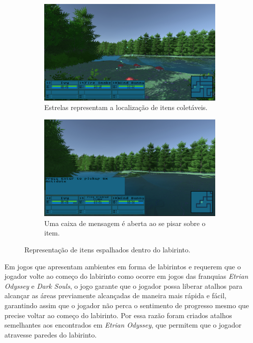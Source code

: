 \begin{figure}[h!]
  \centering
  \begin{subfigure}[b]{0.4\linewidth}
    \includegraphics[width=\linewidth]{itemspot.jpg}
    \caption{Estrelas representam a localização de itens coletáveis.}
  \end{subfigure}
  \begin{subfigure}[b]{0.4\linewidth}
    \includegraphics[width=\linewidth]{itemprompt.jpg}
    \caption{Uma caixa de mensagem é aberta ao se pisar sobre o item.}
  \end{subfigure}
  \caption{Representação de itens espalhados dentro do labirinto.}
  \label{fig:item1}
\end{figure}

Em jogos que apresentam ambientes em forma de labirintos e requerem que o jogador volte ao começo do labirinto como ocorre em jogos das franquias \emph{Etrian Odyssey} e \emph{Dark Souls}, o jogo garante que o jogador possa liberar atalhos para alcançar as áreas previamente alcançadas de maneira mais rápida e fácil, garantindo assim que o jogador não perca o sentimento de progresso mesmo que precise voltar ao começo do labirinto. Por essa razão foram criados atalhos semelhantes aos encontrados em \emph{Etrian Odyssey}, que permitem que o jogador atravesse paredes do labirinto.

